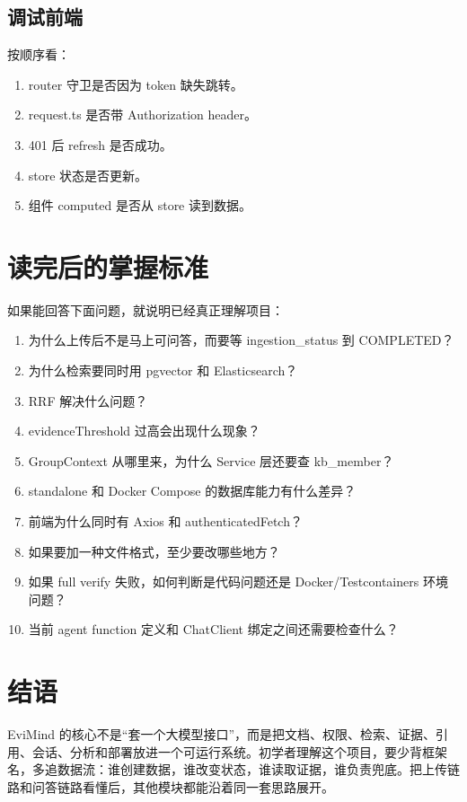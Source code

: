 \documentclass[UTF8,zihao=-4]{ctexart}
\begin{document}
\subsection{调试前端}

按顺序看：

\begin{enumerate}
  \item router 守卫是否因为 token 缺失跳转。
  \item request.ts 是否带 Authorization header。
  \item 401 后 refresh 是否成功。
  \item store 状态是否更新。
  \item 组件 computed 是否从 store 读到数据。
\end{enumerate}

\section{读完后的掌握标准}

如果能回答下面问题，就说明已经真正理解项目：

\begin{enumerate}
  \item 为什么上传后不是马上可问答，而要等 ingestion\_status 到 COMPLETED？
  \item 为什么检索要同时用 pgvector 和 Elasticsearch？
  \item RRF 解决什么问题？
  \item evidenceThreshold 过高会出现什么现象？
  \item GroupContext 从哪里来，为什么 Service 层还要查 kb\_member？
  \item standalone 和 Docker Compose 的数据库能力有什么差异？
  \item 前端为什么同时有 Axios 和 authenticatedFetch？
  \item 如果要加一种文件格式，至少要改哪些地方？
  \item 如果 full verify 失败，如何判断是代码问题还是 Docker/Testcontainers 环境问题？
  \item 当前 agent function 定义和 ChatClient 绑定之间还需要检查什么？
\end{enumerate}

\section{结语}

EviMind 的核心不是“套一个大模型接口”，而是把文档、权限、检索、证据、引用、会话、分析和部署放进一个可运行系统。初学者理解这个项目，要少背框架名，多追数据流：谁创建数据，谁改变状态，谁读取证据，谁负责兜底。把上传链路和问答链路看懂后，其他模块都能沿着同一套思路展开。
\end{document}
